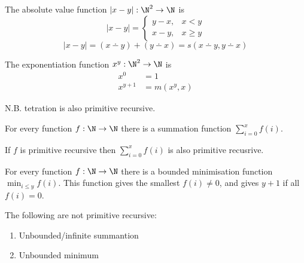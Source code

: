 \documentclass{article}
\begin{document}
\begin{theorem}
    The absolute value function \(\left|x-y\right|:\N^2\to\N\) is
    \begin{equation*}
        \left|x-y\right| = \begin{cases}
            y-x  , & x < y \\
            x-y, & x \ge y
        \end{cases}
    \end{equation*}
    \[
        \left|x-y\right| = \left( x \dotminus y \right) + \left( y \dotminus x \right)
        = s\left( x \dotminus y, y \dotminus x \right)
    \]
\end{theorem}
\begin{theorem}
    The exponentiation function \(x^y:\N^2\to\N\) is
    \begin{align*}
            x^0 &= 1 \\
            x^{y+1} &= m(x^y, x)
    \end{align*}
    
    N.B. tetration is also primitive recursive.
\end{theorem}
\begin{theorem}
    For every function \(f:\N\to\N\) there is a summation function \(\sum_{i=0}^x f(i)\).
\end{theorem}
\begin{theorem}
    If \(f\) is primitive recursive then \(\sum_{i=0}^x f(i)\) is
    also primitive recusrive.
\end{theorem}
\begin{theorem}
    For every function \(f:\N\to\N\) there is a
    bounded minimisation function \(\min_{i\le y} f(i)\).
    This function gives the smallest \(f(i) \ne 0\),
    and gives \(y+1\) if all \(f(i) = 0\).
\end{theorem}
\begin{note}
    The following are not primitive recursive:
    \begin{enumerate}
        \item Unbounded/infinite summantion
        \item Unbounded minimum
    \end{enumerate}
\end{note}
\end{document}
